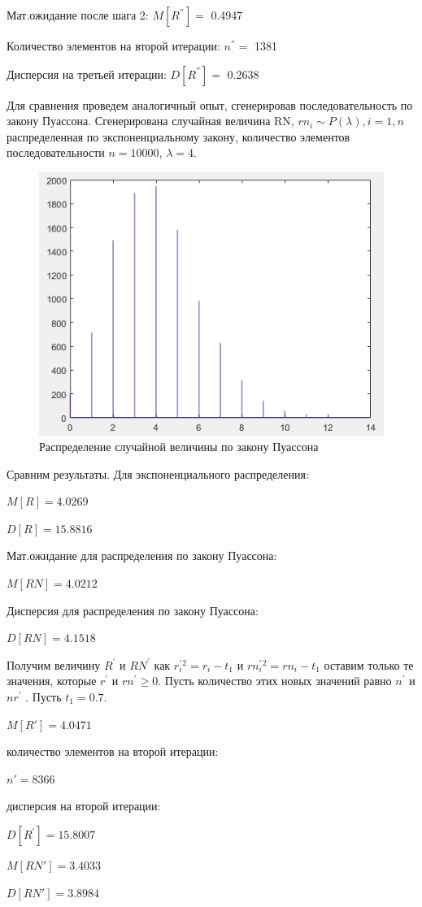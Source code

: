 Мат.ожидание после шага 2: $M[R^{''}]=$ 0.4947 

Количество элементов на второй итерации: $n^{''}=$ 1381 

Дисперсия на третьей итерации: $D[R^{''}]=$ 0.2638 

Для сравнения проведем аналогичный опыт, сгенерировав последовательность
по закону Пуассона. Сгенерирована случайная величина RN, $rn_{i}\sim P(\lambda),i=1,n$ распределенная по экспоненциальному закону, количество элементов последовательности
$n=10000$, $\lambda=4$.
 
\begin{figure}[h]
	\centering
	\includegraphics[width=0.4\linewidth]{img/kich_bur/image5.png} 
	\caption{Распределение случайной величины по закону Пуассона}
	\label{fig:img5}
\end{figure}

Сравним результаты. Для экспоненциального распределения: 

$M[R]= 4.0269$ 

$D[R]= 15.8816$ 

Мат.ожидание для распределения по закону Пуассона: 

$M[RN]= 4.0212$ 

Дисперсия для распределения по закону Пуассона: 

$D[RN]= 4.1518$ 

Получим величину $R^{'}$ и $RN^{'}$ как $r_{i}^{'}{}^{2}=r_{i}-t_{1}$
и $rn_{i}^{'}{}^{2}=rn_{i}-t_{1}$ оставим только те значения, которые
${r^{'}}$ и ${rn^{'}\geq0}$. Пусть количество этих новых
значений равно $n^{'}$ и $nr^{'}$ . Пусть $t_{1}=0.7.$ 

$M[R']= 4.0471$ 

количество элементов на второй итерации: 

$n'= 8366$ 

дисперсия на второй итерации: 

$D[R^{'}]=15.8007$

$M[RN']= 3.4033$ 

$D[RN']= 3.8984$ 

